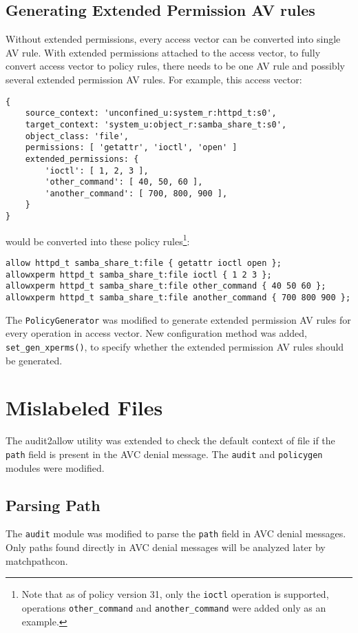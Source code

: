 \subsection{Generating Extended Permission AV rules}
Without extended permissions, every access vector can be converted into single
AV rule. With extended permissions attached to the access vector, to fully
convert access vector to policy rules, there needs to be one AV rule and
possibly several extended permission AV rules. For example, this access vector:
\begin{lstlisting}
{
    source_context: 'unconfined_u:system_r:httpd_t:s0',
    target_context: 'system_u:object_r:samba_share_t:s0',
    object_class: 'file',
    permissions: [ 'getattr', 'ioctl', 'open' ]
    extended_permissions: {
        'ioctl': [ 1, 2, 3 ],
        'other_command': [ 40, 50, 60 ],
        'another_command': [ 700, 800, 900 ],
    }
}
\end{lstlisting}
would be converted into these policy rules\footnote{Note that as of policy
version 31, only the \texttt{ioctl} operation is supported, operations
\texttt{other\_command} and \texttt{another\_command} were added only as an
example.}:
\begin{lstlisting}
allow httpd_t samba_share_t:file { getattr ioctl open };
allowxperm httpd_t samba_share_t:file ioctl { 1 2 3 };
allowxperm httpd_t samba_share_t:file other_command { 40 50 60 };
allowxperm httpd_t samba_share_t:file another_command { 700 800 900 };
\end{lstlisting}

The \texttt{PolicyGenerator} was modified to generate extended permission AV
rules for every operation in access vector. New configuration method was added,
\texttt{set\_gen\_xperms()}, to specify whether the extended permission AV rules
should be generated.

\section{Mislabeled Files}
The audit2allow utility was extended to check the default context of file if the
\texttt{path} field is present in the AVC denial message. The \texttt{audit} and
\texttt{policygen} modules were modified.

\subsection{Parsing Path}
The \texttt{audit} module was modified to parse the \texttt{path} field in AVC
denial messages. Only paths found directly in AVC denial messages will be
analyzed later by matchpathcon.

